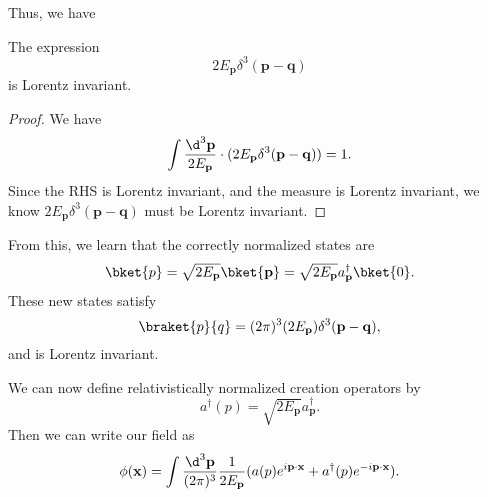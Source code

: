 \documentclass[a4paper]{article}
\begin{document}
Thus, we have
\begin{prop}
  The expression
  \[
    2E_\mathbf{p} \delta^3 (\mathbf{p} - \mathbf{q})
  \]
  is Lorentz invariant.
\end{prop}

\begin{proof}
  We have
  \[
    \int \frac{\d^3 \mathbf{p}}{2 E_\mathbf{p}} \cdot (2E_\mathbf{p} \delta^3(\mathbf{p} - \mathbf{q})) = 1.
  \]
  Since the RHS is Lorentz invariant, and the measure is Lorentz invariant, we know $2E_\mathbf{p} \delta^3(\mathbf{p} - \mathbf{q})$ must be Lorentz invariant.
\end{proof}

From this, we learn that the correctly normalized states are
\[
  \bket{p} = \sqrt{2 E_\mathbf{p}}\bket{\mathbf{p}} = \sqrt{2 E_\mathbf{p}} a_\mathbf{p}^\dagger \bket{0}.
\]
These new states satisfy
\[
  \braket{p}{q} = (2\pi)^3 (2E_\mathbf{p}) \delta^3 (\mathbf{p} - \mathbf{q}),
\]
and is Lorentz invariant.

We can now define relativistically normalized creation operators by
\[
  a^\dagger(p) = \sqrt{2E_\mathbf{p}} a_\mathbf{p}^\dagger.
\]
Then we can write our field as
\[
  \phi (\mathbf{x}) = \int \frac{\d^3 \mathbf{p}}{(2\pi)^3}\frac{1}{2E_\mathbf{p}} (a(p)e^{i\mathbf{p}\cdot \mathbf{x}} + a^\dagger(p) e^{-i\mathbf{p}\cdot \mathbf{x}}).
\]
\end{document}
